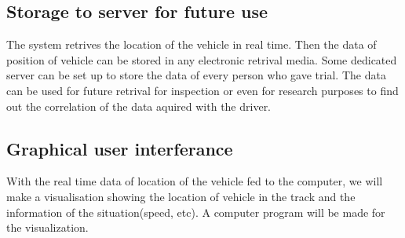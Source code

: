 	\subsection{Storage to server for future use}
		The system retrives the location of the vehicle in real time. Then the data of position of vehicle can be stored in any electronic retrival media. Some dedicated server can be set up to store the data of every person who gave trial. The data can be used for future retrival for inspection or even for research purposes to find out the correlation of the data aquired with the driver.  
	\subsection{Graphical user interferance}
		With the real time data of location of the vehicle fed to the computer, we will make a visualisation showing the location of vehicle in the track and the information of the situation(speed, etc). A computer program will be made for the visualization. 
